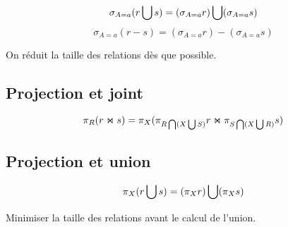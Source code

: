 		$$\sigma_{A = a } (r \bigcup s) = (\sigma_{A = a} r) \bigcup (\sigma_{A = a}s)$$
		$$\sigma_{A = a } (r - s) = (\sigma_{A = a} r) - (\sigma_{A = a}s)$$
		
		On réduit la taille des relations dès que possible.
		
		\subsection{Projection et joint}
		
		$$\pi_R (r \Join s) = \pi_X (\pi_{R \bigcap (X \bigcup S)} r \Join \pi_{S \bigcap (X \bigcup R)} s)$$
		
		
		\subsection{Projection et union}
		
		$$\pi_X(r \bigcup s) = (\pi_X r) \bigcup (\pi_X s)$$
		
		Minimiser la taille des relations avant le calcul de l'union.
		
		